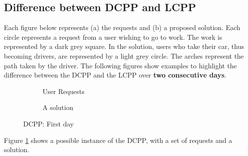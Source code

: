 \documentclass[12pt, a4paper,twoside]{memoir}
\begin{document}
	\subsection*{Difference between DCPP and LCPP}
	Each figure below represents (a) the requests and (b) a proposed solution. Each circle represents a request from a user wishing to go to work. The work is represented by a dark grey square. \newline
	In the solution, users who take their car, thus becoming drivers, are represented by a light grey circle. The arches represent the path taken by the driver.\newline 
	The following figures show examples to highlight the difference between the DCPP and the LCPP over \textbf{two consecutive days}.
	
	\begin{figure}[H]
		\centering
		\begin{subfigure}{.5\textwidth}
			\centering
			\caption{User Requests}
		\end{subfigure}%
		\begin{subfigure}{.5\textwidth}
			\centering
			\caption{A solution}
		\end{subfigure}
		\caption{DCPP: First day}
		\label{fig:DCPP D1}
	\end{figure}
	
	Figure \ref{fig:DCPP D1} shows a possible instance of the DCPP, with a set of requests and a solution.
\end{document}
